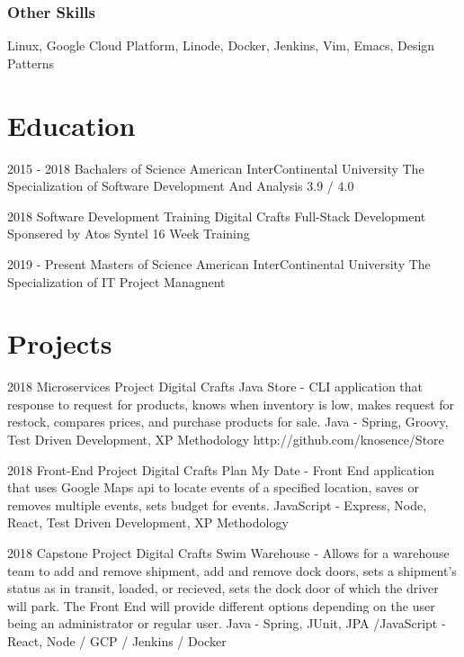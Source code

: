 \documentclass{article}
\begin{document}
\subsubsection{Other Skills}
Linux, Google Cloud Platform, Linode, Docker, Jenkins, Vim, Emacs, Design Patterns

\section{Education}
2015 - 2018 Bachalers of Science
American InterContinental University
The Specialization of Software Development And Analysis
3.9 / 4.0

2018 Software Development Training
Digital Crafts
Full-Stack Development Sponsered by Atos Syntel
16 Week Training

2019 - Present Masters of Science
American InterContinental University
The Specialization of IT Project Managnent


\section{Projects}
2018 Microservices Project
Digital Crafts
Java Store - CLI application that response to request for products, knows when inventory is low, makes request for
restock, compares prices, and purchase products for sale.
Java - Spring, Groovy, Test Driven Development, XP Methodology
http://github.com/knosence/Store


2018 Front-End Project
Digital Crafts
Plan My Date - Front End application that uses Google Maps api to locate events
of a specified location, saves or removes multiple events, sets budget for
events.
JavaScript - Express, Node, React, Test Driven Development, XP Methodology

2018 Capstone Project
Digital Crafts
Swim Warehouse - Allows for a warehouse team to add and remove shipment, add and
remove dock doors, sets a shipment's status as in transit, loaded, or recieved,
sets the dock door of which the driver will park. The Front End will provide
different options depending on the user being an administrator or regular user.
Java - Spring, JUnit, JPA /JavaScript - React, Node / GCP / Jenkins / Docker
\end{document}

